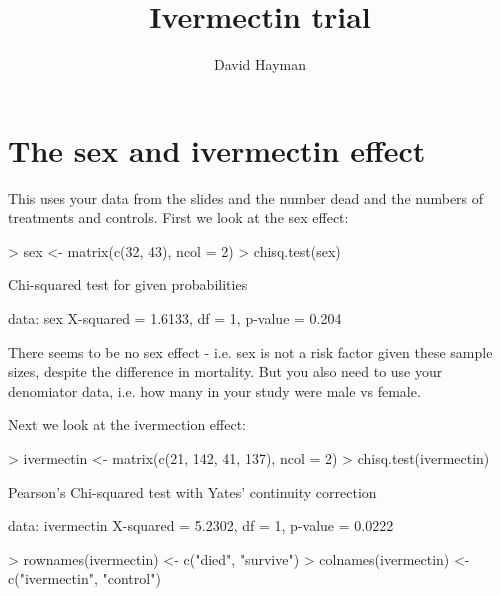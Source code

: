 \documentclass{article}
\begin{document}


\title{Ivermectin trial}
\author{David Hayman}





\maketitle


\section{The sex and ivermectin effect}

This uses your data from the slides and the number dead and the numbers of treatments and controls. First we look at the sex effect:

\begin{Schunk}
\begin{Sinput}
> sex <- matrix(c(32, 43), ncol = 2)
> chisq.test(sex)
\end{Sinput}
\begin{Soutput}
	Chi-squared test for given probabilities

data:  sex
X-squared = 1.6133, df = 1, p-value = 0.204
\end{Soutput}
\end{Schunk}

There seems to be no sex effect - i.e. sex is not a risk factor given these sample sizes, despite the difference in mortality. But you also need to use your denomiator data, i.e. how many in your study were male vs female.

Next we look at the ivermection effect:

\begin{Schunk}
\begin{Sinput}
> ivermectin <- matrix(c(21, 142, 41, 137), ncol = 2)
> chisq.test(ivermectin)
\end{Sinput}
\begin{Soutput}
	Pearson's Chi-squared test with Yates' continuity correction

data:  ivermectin
X-squared = 5.2302, df = 1, p-value = 0.0222
\end{Soutput}
\begin{Sinput}
> rownames(ivermectin) <- c("died", "survive")
> colnames(ivermectin) <- c("ivermectin", "control")
\end{Sinput}
\end{Schunk}
\end{document}
